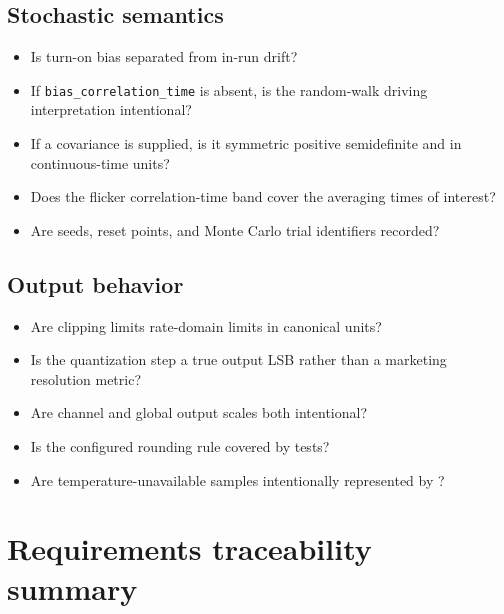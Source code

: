 \documentclass[11pt,oneside,headings=big]{scrreprt}
\newcommand{\field}[1]{\texttt{#1}}
\begin{document}
    \section*{Stochastic semantics}
    \begin{itemize}
        \item Is turn-on bias separated from in-run drift?
        \item If \field{bias\_correlation\_time} is absent, is the random-walk driving
        interpretation intentional?
        \item If a covariance is supplied, is it symmetric positive semidefinite and in
        continuous-time units?
        \item Does the flicker correlation-time band cover the averaging times of
        interest?
        \item Are seeds, reset points, and Monte Carlo trial identifiers recorded?
    \end{itemize}


    \section*{Output behavior}
    \begin{itemize}
        \item Are clipping limits rate-domain limits in canonical units?
        \item Is the quantization step a true output LSB rather than a marketing
        resolution metric?
        \item Are channel and global output scales both intentional?
        \item Is the configured rounding rule covered by tests?
        \item Are temperature-unavailable samples intentionally represented by
        ?
    \end{itemize}


    \chapter{Requirements traceability summary}
    \label{app:traceability}
\end{document}
